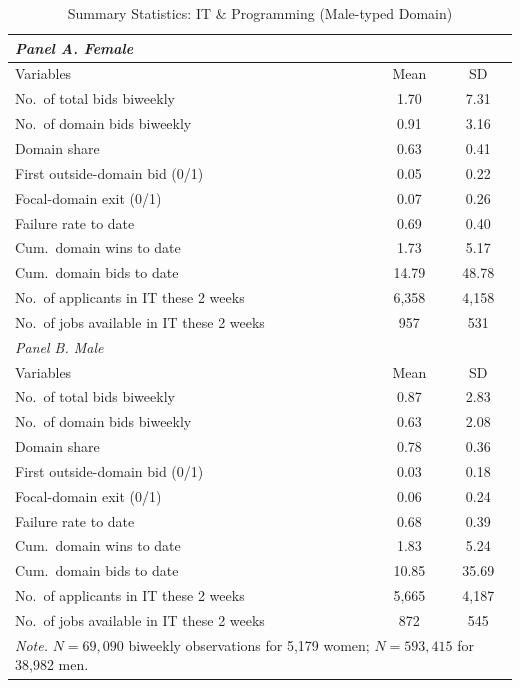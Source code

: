 \documentclass[12pt]{article}
\begin{document}
\begin{table}[htbp]
\centering
\caption{Summary Statistics: IT \& Programming (Male-typed Domain)}
\label{tab:desc_it}
\small
\begin{tabular}{lcc}
\hline\hline
\multicolumn{3}{l}{\textit{Panel A. Female}} \\
\hline
Variables & Mean & SD \\
\hline
No.\ of total bids biweekly & 1.70 & 7.31 \\
No.\ of domain bids biweekly & 0.91 & 3.16 \\
Domain share & 0.63 & 0.41 \\
First outside-domain bid (0/1) & 0.05 & 0.22 \\
Focal-domain exit (0/1) & 0.07 & 0.26 \\
Failure rate to date & 0.69 & 0.40 \\
Cum.\ domain wins to date & 1.73 & 5.17 \\
Cum.\ domain bids to date & 14.79 & 48.78 \\
No.\ of applicants in IT these 2 weeks & 6,358 & 4,158 \\
No.\ of jobs available in IT these 2 weeks & 957 & 531 \\
\hline
\multicolumn{3}{l}{\textit{Panel B. Male}} \\
\hline
Variables & Mean & SD \\
\hline
No.\ of total bids biweekly & 0.87 & 2.83 \\
No.\ of domain bids biweekly & 0.63 & 2.08 \\
Domain share & 0.78 & 0.36 \\
First outside-domain bid (0/1) & 0.03 & 0.18 \\
Focal-domain exit (0/1) & 0.06 & 0.24 \\
Failure rate to date & 0.68 & 0.39 \\
Cum.\ domain wins to date & 1.83 & 5.24 \\
Cum.\ domain bids to date & 10.85 & 35.69 \\
No.\ of applicants in IT these 2 weeks & 5,665 & 4,187 \\
No.\ of jobs available in IT these 2 weeks & 872 & 545 \\
\hline\hline
\multicolumn{3}{p{0.75\textwidth}}{
\footnotesize \textit{Note.} $N = 69{,}090$ biweekly observations for 5,179 women; $N = 593{,}415$ for 38,982 men.
} \\
\end{tabular}
\end{table}
\end{document}
